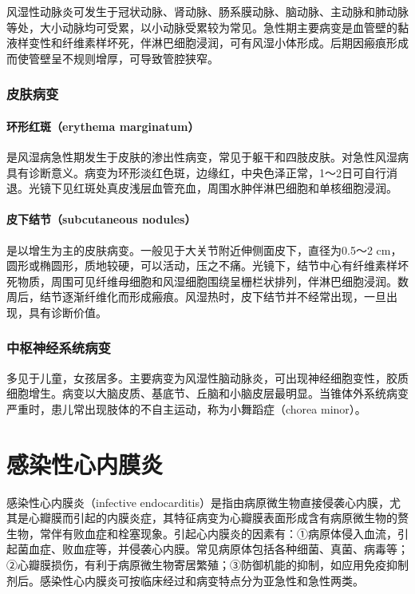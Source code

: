 风湿性动脉炎可发生于冠状动脉、肾动脉、肠系膜动脉、脑动脉、主动脉和肺动脉等处，大小动脉均可受累，以小动脉受累较为常见。急性期主要病变是血管壁的黏液样变性和纤维素样坏死，伴淋巴细胞浸润，可有风湿小体形成。后期因瘢痕形成而使管壁呈不规则增厚，可导致管腔狭窄。

\subsubsection{皮肤病变}

\paragraph{环形红斑（erythema marginatum）}
是风湿病急性期发生于皮肤的渗出性病变，常见于躯干和四肢皮肤。对急性风湿病具有诊断意义。病变为环形淡红色斑，边缘红，中央色泽正常，1～2日可自行消退。光镜下见红斑处真皮浅层血管充血，周围水肿伴淋巴细胞和单核细胞浸润。

\paragraph{皮下结节（subcutaneous nodules）}
是以增生为主的皮肤病变。一般见于大关节附近伸侧面皮下，直径为0.5～2
cm，圆形或椭圆形，质地较硬，可以活动，压之不痛。光镜下，结节中心有纤维素样坏死物质，周围可见纤维母细胞和风湿细胞围绕呈栅栏状排列，伴淋巴细胞浸润。数周后，结节逐渐纤维化而形成瘢痕。风湿热时，皮下结节并不经常出现，一旦出现，具有诊断价值。

\subsubsection{中枢神经系统病变}

多见于儿童，女孩居多。主要病变为风湿性脑动脉炎，可出现神经细胞变性，胶质细胞增生。病变以大脑皮质、基底节、丘脑和小脑皮层最明显。当锥体外系统病变严重时，患儿常出现肢体的不自主运动，称为小舞蹈症（chorea
minor）。

\section{感染性心内膜炎}

感染性心内膜炎（infective
endocarditis）是指由病原微生物直接侵袭心内膜，尤其是心瓣膜而引起的内膜炎症，其特征病变为心瓣膜表面形成含有病原微生物的赘生物，常伴有败血症和栓塞现象。引起心内膜炎的因素有：①病原体侵入血流，引起菌血症、败血症等，并侵袭心内膜。常见病原体包括各种细菌、真菌、病毒等；②心瓣膜损伤，有利于病原微生物寄居繁殖；③防御机能的抑制，如应用免疫抑制剂后。感染性心内膜炎可按临床经过和病变特点分为亚急性和急性两类。

